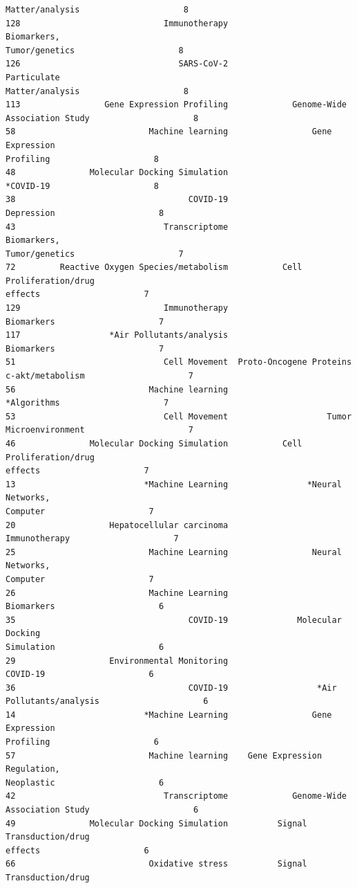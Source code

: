 \documentclass[11pt]{article}
\begin{document}
\begin{Verbatim}[commandchars=\\\{\}]
Matter/analysis                     8
128                             Immunotherapy                Biomarkers,
Tumor/genetics                     8
126                                SARS-CoV-2               Particulate
Matter/analysis                     8
113                 Gene Expression Profiling             Genome-Wide
Association Study                     8
58                           Machine learning                 Gene Expression
Profiling                     8
48               Molecular Docking Simulation
*COVID-19                     8
38                                   COVID-19
Depression                     8
43                              Transcriptome                Biomarkers,
Tumor/genetics                     7
72         Reactive Oxygen Species/metabolism           Cell Proliferation/drug
effects                     7
129                             Immunotherapy
Biomarkers                     7
117                  *Air Pollutants/analysis
Biomarkers                     7
51                              Cell Movement  Proto-Oncogene Proteins
c-akt/metabolism                     7
56                           Machine learning
*Algorithms                     7
53                              Cell Movement                    Tumor
Microenvironment                     7
46               Molecular Docking Simulation           Cell Proliferation/drug
effects                     7
13                          *Machine Learning                *Neural Networks,
Computer                     7
20                   Hepatocellular carcinoma
Immunotherapy                     7
25                           Machine Learning                 Neural Networks,
Computer                     7
26                           Machine Learning
Biomarkers                     6
35                                   COVID-19              Molecular Docking
Simulation                     6
29                   Environmental Monitoring
COVID-19                     6
36                                   COVID-19                  *Air
Pollutants/analysis                     6
14                          *Machine Learning                 Gene Expression
Profiling                     6
57                           Machine learning    Gene Expression Regulation,
Neoplastic                     6
42                              Transcriptome             Genome-Wide
Association Study                     6
49               Molecular Docking Simulation          Signal Transduction/drug
effects                     6
66                           Oxidative stress          Signal Transduction/drug

\end{Verbatim}
\end{document}
